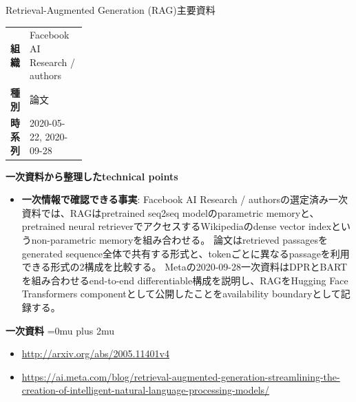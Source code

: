\begin{technicalnote}{Retrieval-Augmented Generation (RAG)}{主要資料}
\begingroup
\begin{tabularx}{\linewidth}{@{}>{\bfseries}p{0.22\linewidth}X@{}}
組織 & Facebook AI Research / authors \\
種別 & 論文 \\
時系列 & 2020-05-22, 2020-09-28 \\
\end{tabularx}
\smallskip
\begin{minipage}{\linewidth}
{\bfseries 一次資料から整理したtechnical points}
\begin{itemize}[leftmargin=1.5em,itemsep=0.35em]
\item \textbf{一次情報で確認できる事実}: Facebook AI Research / authorsの選定済み一次資料では、RAGはpretrained seq2seq modelのparametric memoryと、pretrained neural retrieverでアクセスするWikipediaのdense vector indexというnon-parametric memoryを組み合わせる。 論文はretrieved passagesをgenerated sequence全体で共有する形式と、tokenごとに異なるpassageを利用できる形式の2構成を比較する。 Metaの2020-09-28一次資料はDPRとBARTを組み合わせるend-to-end differentiable構成を説明し、RAGをHugging Face Transformers componentとして公開したことをavailability boundaryとして記録する。
\end{itemize}
\begin{samepage}
{\bfseries 一次資料}
\begingroup\sloppy
\Urlmuskip=0mu plus 2mu\relax
\begin{itemize}[leftmargin=1.5em,itemsep=0.25em]
\item {\scriptsize\url{http://arxiv.org/abs/2005.11401v4}}
\item {\scriptsize\url{https://ai.meta.com/blog/retrieval-augmented-generation-streamlining-the-creation-of-intelligent-natural-language-processing-models/}}
\end{itemize}
\endgroup
\end{samepage}
\end{minipage}
\endgroup
\end{technicalnote}
\medskip

